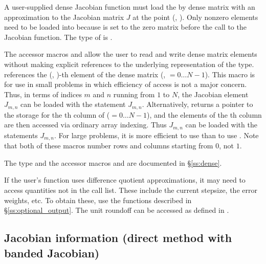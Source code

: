 {
  A user-supplied dense Jacobian function must load the  by 
  dense matrix  with an approximation to the Jacobian matrix $J$
  at the point (, ).  Only nonzero elements need to be loaded
  into  because  is set to the zero matrix before the call
  to the Jacobian function. The type of  is . 
  
  The accessor macros  and  allow the user to
  read and write dense matrix elements without making explicit
  references to the underlying representation of the 
  type.  references the (, )-th
  element of the dense matrix  (, $= 0\ldots N-1$). This macro
  is for use in small problems in which efficiency of access is not a major
  concern.  Thus, in terms of indices $m$ and $n$ running from $1$ to
  $N$, the Jacobian element $J_{m,n}$ can be loaded with the statement
   $J_{m,n}$.  Alternatively,
   returns a pointer to the storage for
  the th column of  ($= 0\ldots N-1$), and the 
  elements of the th column
  are then accessed via ordinary array indexing.  Thus $J_{m,n}$ can be 
  loaded with the statements 
   $J_{m,n}$.  For large problems, it is more 
  efficient to use  than to use . 
  Note that both of these macros number rows and columns
  starting from $0$, not $1$.  

  The  type and the accessor macros  and 
   are documented in \S\ref{ss:dense}.

  If the user's  function uses difference quotient
  approximations, it may need to access quantities not in the call
  list. These include the current stepsize, the error weights, etc.
  To obtain these, use the  functions described in
  \S\ref{ss:optional_output}. The unit roundoff can be accessed
  as  defined in .
}

\subsection{Jacobian information (direct method with banded Jacobian)}
\label{ss:bjacFn}


